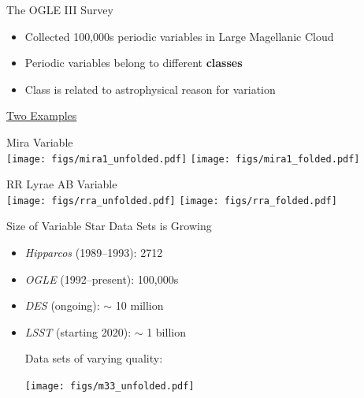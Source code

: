 \documentclass[12pt]{beamer}
\begin{document}
\begin{frame}{The OGLE III Survey \cite{udalski2008optical}}
\begin{itemize}
\item Collected 100,000s periodic variables in Large Magellanic Cloud
\item Periodic variables belong to different \textbf{classes}
\item Class is related to astrophysical reason for variation
\end{itemize}

\underline{Two Examples}
\begin{center}
Mira Variable\\
\texttt{[image: figs/mira1\_unfolded.pdf]}
\texttt{[image: figs/mira1\_folded.pdf]}
\end{center}

\vspace{.1in}

\begin{center}
RR Lyrae AB Variable\\
\texttt{[image: figs/rra\_unfolded.pdf]}
\texttt{[image: figs/rra\_folded.pdf]}
\end{center}

\end{frame}


\begin{frame}{Size of Variable Star Data Sets is Growing}
\begin{itemize}
\item \textit{Hipparcos} (1989--1993): 2712 
\item \textit{OGLE} (1992--present): 100,000s
\item \textit{DES} (ongoing): $\sim$ 10 million
\item \textit{LSST} (starting 2020): $\sim$ 1 billion

\vspace{.4in}

Data sets of varying quality:
\begin{center}
\texttt{[image: figs/m33\_unfolded.pdf]}
\end{center}


\end{itemize}


\end{frame}



\end{document}
